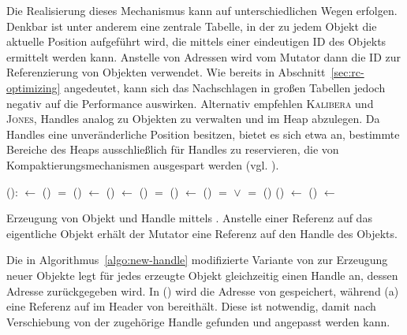 Die Realisierung dieses Mechanismus kann auf unterschiedlichen Wegen erfolgen.
Denkbar ist unter anderem eine zentrale Tabelle, in der zu jedem Objekt die aktuelle Position aufgeführt wird, die mittels einer eindeutigen ID des Objekts ermittelt werden kann.
Anstelle von Adressen wird vom Mutator dann die ID zur Referenzierung von Objekten verwendet.
Wie bereits in Abschnitt~\ref{sec:rc-optimizing} angedeutet, kann sich das Nachschlagen in großen Tabellen jedoch negativ auf die Performance auswirken.
Alternativ empfehlen \textsc{Kalibera} und \textsc{Jones}, Handles analog zu Objekten zu verwalten und im Heap abzulegen.
Da Handles eine unveränderliche Position besitzen, bietet es sich etwa an, bestimmte Bereiche des Heaps ausschließlich für Handles zu reservieren, die von Kompaktierungsmechanismen ausgespart werden (vgl. \cite[S. 90f]{kalibera2011}).

\begin{algorithm}
\begin{algorithmic}[1]
	\State {}():
	\State \quad {} $\gets$ ()	
	\State \quad \IF {} $=$ \Null
	\State \quad \quad {}()
	\State \quad \quad {} $\gets$ ()
	\State \quad {} $\gets$ ()	
	\State \quad \IF {} $=$ \Null
	\State \quad \quad {}()
	\State \quad \quad {} $\gets$ ()	
	\State \quad \IF {} $=$ \Null $\vee$  $=$ \Null
	\State \quad \quad {}()
	\State \quad {}() $\gets$ 		
	\State \quad {}() $\gets$ 		
	\State \quad \Return {}	
\end{algorithmic}
\caption[Erzeugung von Objekt und Handle mittels ]{Erzeugung von Objekt und Handle mittels . Anstelle einer Referenz auf das eigentliche Objekt erhält der Mutator eine Referenz auf den Handle des Objekts.}
\label{algo:new-handle}
\end{algorithm}

Die in Algorithmus~\ref{algo:new-handle} modifizierte Variante von  zur Erzeugung neuer Objekte legt für jedes erzeugte Objekt  gleichzeitig einen Handle  an, dessen Adresse zurückgegeben wird.
In () wird die Adresse von  gespeichert, während (a) eine Referenz auf  im Header von  bereithält.
Diese ist notwendig, damit nach Verschiebung von  der zugehörige Handle gefunden und angepasst werden kann.

